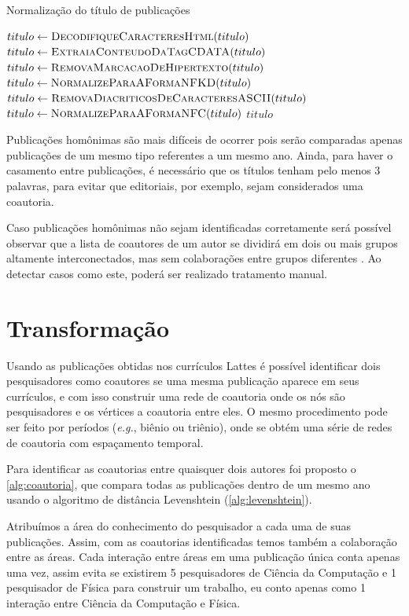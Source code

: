 \begin{algorithm}
\caption{Normalização do título de publicações}
\label{alg:normalizacao}
\begin{algorithmic}[1]

\State $titulo\gets \Call{DecodifiqueCaracteresHtml}{titulo}$
\State $titulo\gets \Call{ExtraiaConteudoDaTagCDATA}{titulo}$
\State $titulo\gets \Call{RemovaMarcacaoDeHipertexto}{titulo}$
\State $titulo\gets \Call{NormalizeParaAFormaNFKD}{titulo}$
\State $titulo\gets \Call{RemovaDiacriticosDeCaracteresASCII}{titulo}$
\State $titulo\gets \Call{NormalizeParaAFormaNFC}{titulo}$
\State \Return $titulo$
\EndProcedure

\end{algorithmic}
\end{algorithm}

Publicações homônimas são mais difíceis de ocorrer pois serão comparadas apenas publicações de um mesmo tipo referentes a um mesmo ano. Ainda, para haver o casamento entre publicações, é necessário que os títulos tenham pelo menos 3 palavras, para evitar que editoriais, por exemplo, sejam considerados uma coautoria.

Caso publicações homônimas não sejam identificadas corretamente será possível observar que a lista de coautores de um autor se dividirá em dois ou mais grupos altamente interconectados, mas sem colaborações entre grupos diferentes \cite{franceschet2011collaboration}. Ao detectar casos como este, poderá ser realizado tratamento manual.

\section{Transformação}

Usando as publicações obtidas nos currículos Lattes é possível identificar dois pesquisadores como coautores se uma mesma publicação aparece em seus currículos, e com isso construir uma rede de coautoria onde os nós são pesquisadores e os vértices a coautoria entre eles. O mesmo procedimento pode ser feito por períodos (\textit{e.g.}, biênio ou triênio), onde se obtém uma série de redes de coautoria com espaçamento temporal.

Para identificar as coautorias entre quaisquer dois autores foi proposto o \autoref{alg:coautoria}, que compara todas as publicações dentro de um mesmo ano usando o algoritmo de distância Levenshtein (\autoref{alg:levenshtein}).

Atribuímos a área do conhecimento do pesquisador a cada uma de suas publicações. Assim, com as coautorias identificadas temos também a colaboração entre as áreas. Cada interação entre áreas em uma publicação única conta apenas uma vez, assim evita se existirem 5 pesquisadores de Ciência da Computação e 1 pesquisador de Física para construir um trabalho, eu conto apenas como 1 interação entre Ciência da Computação e Física.



